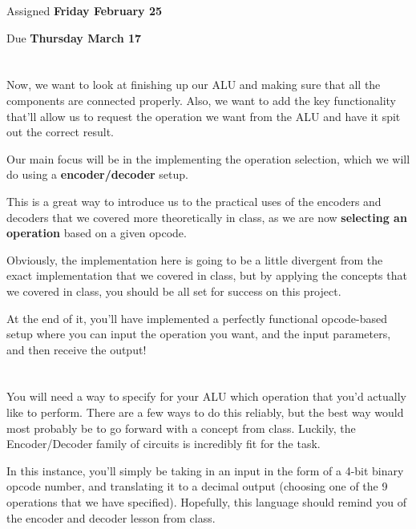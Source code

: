 \documentclass{article}
\begin{document}
\large

{\selectfont{\Huge CMSC389E Project 3: \par Finishing the ALU}}

Assigned \textbf{Friday February 25}

Due \textbf{Thursday March 17}

\section{\selectfont{Looking More like a Computer Every Day}}

Now, we want to look at finishing up our ALU and making sure that all the components are connected properly. 
Also, we want to add the key functionality that'll allow us to request the operation we want from the ALU and have it spit out the correct result.

Our main focus will be in the implementing the operation selection, which we will do using a \textbf{encoder/decoder} setup.

This is a great way to introduce us to the practical uses of the encoders and decoders that we covered more theoretically in class, as we are now \textbf{selecting an operation} based on a given opcode.

Obviously, the implementation here is going to be a little divergent from the exact implementation that we covered in class, but by applying the concepts that we covered in class, you should be all set for success on this project.

At the end of it, you'll have implemented a perfectly functional opcode-based setup where you can input the operation you want, and the input parameters, and then receive the output! 

\section{\selectfont{Conceptual Overview: Encoding/Decoding}}

You will need a way to specify for your ALU which operation that you'd actually like to perform. There are a few ways to do this reliably, but the best way would most probably be to go forward with a concept from class. 
Luckily, the Encoder/Decoder family of circuits is incredibly fit for the task.

In this instance, you'll simply be taking in an input in the form of a 4-bit binary opcode number, and translating it to a decimal output (choosing one of the 9 operations that we have specified).
Hopefully, this language should remind you of the encoder and decoder lesson from class.
\end{document}
